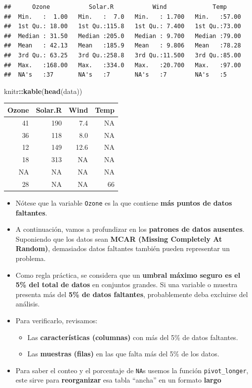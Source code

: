 \documentclass[
]{book}
\newenvironment{Shaded}{\begin{snugshade}}{\end{snugshade}}
\newcommand{\FunctionTok}[1]{\textcolor[rgb]{0.13,0.29,0.53}{\textbf{#1}}}
\newcommand{\NormalTok}[1]{#1}
\newcommand{\SpecialCharTok}[1]{\textcolor[rgb]{0.81,0.36,0.00}{\textbf{#1}}}
\providecommand{\tightlist}{%
  \setlength{\itemsep}{0pt}\setlength{\parskip}{0pt}}
\begin{document}
\begin{verbatim}
##      Ozone           Solar.R           Wind             Temp      
##  Min.   :  1.00   Min.   :  7.0   Min.   : 1.700   Min.   :57.00  
##  1st Qu.: 18.00   1st Qu.:115.8   1st Qu.: 7.400   1st Qu.:73.00  
##  Median : 31.50   Median :205.0   Median : 9.700   Median :79.00  
##  Mean   : 42.13   Mean   :185.9   Mean   : 9.806   Mean   :78.28  
##  3rd Qu.: 63.25   3rd Qu.:258.8   3rd Qu.:11.500   3rd Qu.:85.00  
##  Max.   :168.00   Max.   :334.0   Max.   :20.700   Max.   :97.00  
##  NA's   :37       NA's   :7       NA's   :7        NA's   :5
\end{verbatim}

\begin{Shaded}
\begin{Highlighting}[]
\NormalTok{knitr}\SpecialCharTok{::}\FunctionTok{kable}\NormalTok{(}\FunctionTok{head}\NormalTok{(data))}
\end{Highlighting}
\end{Shaded}

\begin{tabular}{r|r|r|r}
\hline
Ozone & Solar.R & Wind & Temp\\
\hline
41 & 190 & 7.4 & NA\\
\hline
36 & 118 & 8.0 & NA\\
\hline
12 & 149 & 12.6 & NA\\
\hline
18 & 313 & NA & NA\\
\hline
NA & NA & NA & NA\\
\hline
28 & NA & NA & 66\\
\hline
\end{tabular}

\begin{itemize}
\item
  Nótese que la variable \texttt{Ozone} es la que contiene \textbf{más puntos de datos faltantes}.
\item
  A continuación, vamos a profundizar en los \textbf{patrones de datos ausentes}. Suponiendo que los datos sean \textbf{MCAR (Missing Completely At Random)}, demasiados datos faltantes también pueden representar un problema.
\item
  Como regla práctica, se considera que un \textbf{umbral máximo seguro es el 5\% del total de datos} en conjuntos grandes. Si una variable o muestra presenta más del \textbf{5\% de datos faltantes}, probablemente deba excluirse del análisis.
\item
  Para verificarlo, revisamos:

  \begin{itemize}
  \tightlist
  \item
    Las \textbf{características (columnas)} con más del 5\% de datos faltantes.\\
  \item
    Las \textbf{muestras (filas)} en las que falta más del 5\% de los datos.
  \end{itemize}
\item
  Para saber el conteo y el porcentaje de \texttt{NA}s usemos la función \texttt{pivot\_longer}, este sirve para \textbf{reorganizar} esa tabla ``ancha'' en un formato \textbf{largo}
\end{itemize}
\end{document}
